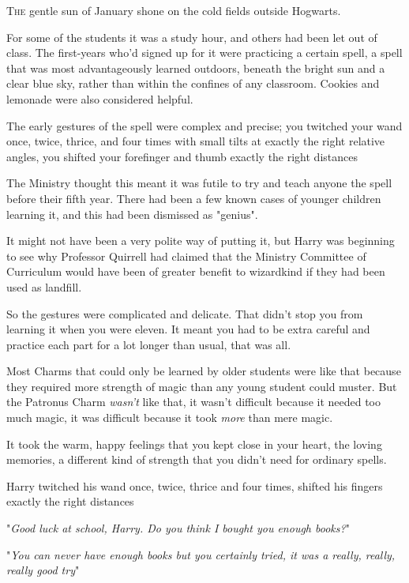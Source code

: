 
\lettrine{T}{he} gentle sun of
January shone on the cold fields outside Hogwarts.

For some of the students it was a study hour, and others had been let out of
class. The first-years who'd signed up for it were practicing a certain spell,
a spell that was most advantageously learned outdoors, beneath the bright sun
and a clear blue sky, rather than within the confines of any classroom. Cookies
and lemonade were also considered helpful.

The early gestures of the spell were complex and precise; you twitched your
wand once, twice, thrice, and four times with small tilts at exactly the right
relative angles, you shifted your forefinger and thumb exactly the right
distances{\el}

The Ministry thought this meant it was futile to try and teach anyone the spell
before their fifth year. There had been a few known cases of younger children
learning it, and this had been dismissed as "genius".

It might not have been a very polite way of putting it, but Harry was beginning
to see why Professor Quirrell had claimed that the Ministry Committee of
Curriculum would have been of greater benefit to wizardkind if they had been
used as landfill.

So the gestures were complicated and delicate. That didn't stop you from
learning it when you were eleven. It meant you had to be extra careful and
practice each part for a lot longer than usual, that was all.

Most Charms that could only be learned by older students were like that because
they required more strength of magic than any young student could muster. But
the Patronus Charm \emph{wasn't} like that, it wasn't difficult because it
needed too much magic, it was difficult because it took \emph{more} than mere
magic.

It took the warm, happy feelings that you kept close in your heart, the loving
memories, a different kind of strength that you didn't need for ordinary spells.

Harry twitched his wand once, twice, thrice and four times, shifted his fingers
exactly the right distances{\el}

"\emph{Good luck at school, Harry. Do you think I bought you enough books?}"

"\emph{You can never have enough books{\el} but you certainly tried, it was
a really, really, really good try{\el}}"

